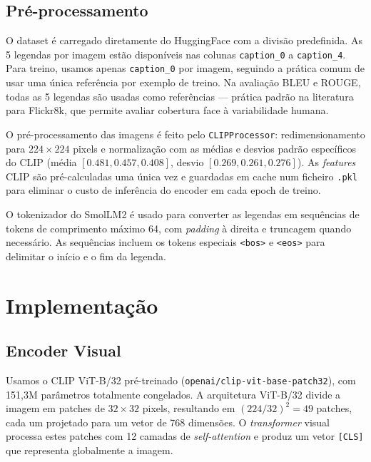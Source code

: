 \documentclass[conference]{IEEEtran}
\begin{document}
\subsection{Pré-processamento}

O dataset é carregado diretamente do HuggingFace com a divisão predefinida. As 5 legendas por imagem estão disponíveis nas colunas \texttt{caption\_0} a \texttt{caption\_4}. Para treino, usamos apenas \texttt{caption\_0} por imagem, seguindo a prática comum de usar uma única referência por exemplo de treino. Na avaliação BLEU e ROUGE, todas as 5 legendas são usadas como referências --- prática padrão na literatura para Flickr8k, que permite avaliar cobertura face à variabilidade humana.

O pré-processamento das imagens é feito pelo \texttt{CLIPProcessor}: redimensionamento para $224\times224$ pixels e normalização com as médias e desvios padrão específicos do CLIP (média $[0.481, 0.457, 0.408]$, desvio $[0.269, 0.261, 0.276]$). As \textit{features} CLIP são pré-calculadas uma única vez e guardadas em cache num ficheiro \texttt{.pkl} para eliminar o custo de inferência do encoder em cada epoch de treino.

O tokenizador do SmolLM2 é usado para converter as legendas em sequências de tokens de comprimento máximo 64, com \textit{padding} à direita e truncagem quando necessário. As sequências incluem os tokens especiais \texttt{<bos>} e \texttt{<eos>} para delimitar o início e o fim da legenda.


\section{Implementação}

\subsection{Encoder Visual}

Usamos o CLIP ViT-B/32 pré-treinado (\texttt{openai/clip-vit-base-patch32}), com 151,3M parâmetros totalmente congelados. A arquitetura ViT-B/32 divide a imagem em patches de $32\times32$ pixels, resultando em $(224/32)^2 = 49$ patches, cada um projetado para um vetor de 768 dimensões. O \textit{transformer} visual processa estes patches com 12 camadas de \textit{self-attention} e produz um vetor \texttt{[CLS]} que representa globalmente a imagem.
\end{document}
